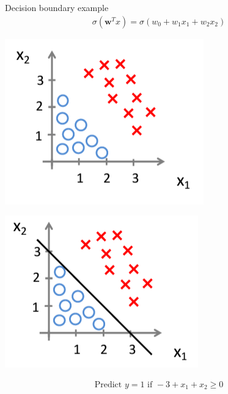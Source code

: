 \documentclass[serif, aspectratio=169]{beamer}
\begin{document}
    \begin{frame}{Decision boundary example}
        \begin{align*}
            \sigma (\mathbf{w}^Tx) = \sigma (w_0 + w_1 x_1 + w_2 x_2)
        \end{align*}

        \begin{minipage}{0.35\linewidth}
            \centering
            \includegraphics[width=\linewidth]{pic/lrDB1.png}
        \end{minipage}
        \hfill
        \begin{minipage}{0.35\linewidth}
            \centering
            \includegraphics[width=\linewidth]{pic/lrDB2.png}
        \end{minipage}

        \begin{align*}
            \text{Predict } y=1 \text{ if } -3 + x_1 + x_2 \geq 0
        \end{align*}

    \end{frame}
\end{document}
